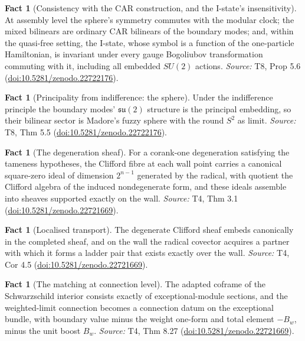 \documentclass[11pt]{article}
\theoremstyle{definition}
\newtheorem{fact}[theorem]{Fact}
\theoremstyle{plain}
\begin{document}
\begin{fact}[Consistency with the CAR construction, and the I-state's insensitivity]\label{c:scrambling.consistency-car-construction-i-states-insensitivity}
At assembly level the sphere's symmetry commutes with the modular clock; the mixed bilinears are ordinary CAR bilinears of the boundary modes; and, within the quasi-free setting, the I-state, whose symbol is a function of the one-particle Hamiltonian, is invariant under every gauge Bogoliubov transformation commuting with it, including all embedded $SU(2)$ actions.
\emph{Source:} T8, Prop 5.6 (\href{https://doi.org/10.5281/zenodo.22722176}{doi:10.5281/zenodo.22722176}).
\end{fact}

\begin{fact}[Principality from indifference: the sphere]\label{c:scrambling.principality-indifference-sphere}
Under the indifference principle the boundary modes' $\mathfrak{su}(2)$ structure is the principal embedding, so their bilinear sector is Madore's fuzzy sphere with the round $S^2$ as limit.
\emph{Source:} T8, Thm 5.5 (\href{https://doi.org/10.5281/zenodo.22722176}{doi:10.5281/zenodo.22722176}).
\end{fact}

\begin{fact}[The degeneration sheaf]\label{c:sheaf.degeneration-sheaf}
For a corank-one degeneration satisfying the tameness hypotheses, the Clifford fibre at each wall point carries a canonical square-zero ideal of dimension $2^{n-1}$ generated by the radical, with quotient the Clifford algebra of the induced nondegenerate form, and these ideals assemble into sheaves supported exactly on the wall.
\emph{Source:} T4, Thm 3.1 (\href{https://doi.org/10.5281/zenodo.22721669}{doi:10.5281/zenodo.22721669}).
\end{fact}

\begin{fact}[Localised transport]\label{c:sheaf.localised-transport}
The degenerate Clifford sheaf embeds canonically in the completed sheaf, and on the wall the radical covector acquires a partner with which it forms a ladder pair that exists exactly over the wall.
\emph{Source:} T4, Cor 4.5 (\href{https://doi.org/10.5281/zenodo.22721669}{doi:10.5281/zenodo.22721669}).
\end{fact}

\begin{fact}[The matching at connection level]\label{c:sheaf.matching-connection-level}
The adapted coframe of the Schwarzschild interior consists exactly of exceptional-module sections, and the weighted-limit connection becomes a connection datum on the exceptional bundle, with boundary value minus the weight one-form and total element $-B_w$, minus the unit boost $B_w$.
\emph{Source:} T4, Thm 8.27 (\href{https://doi.org/10.5281/zenodo.22721669}{doi:10.5281/zenodo.22721669}).
\end{fact}
\end{document}
